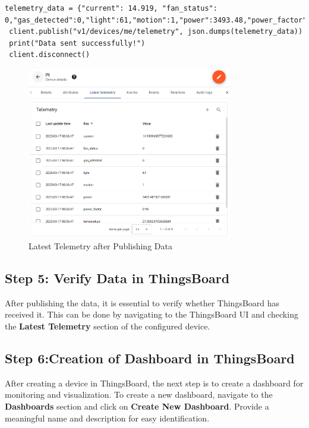 \documentclass[a4paper,12pt]{report}
\begin{document}
 \begin{lstlisting}[caption={Sending Telemetry Response in JSON}]
 telemetry_data = {"current": 14.919, "fan_status": 0,"gas_detected":0,"light":61,"motion":1,"power":3493.48,"power_factor":0.98,"temperature":27.85}
 client.publish("v1/devices/me/telemetry", json.dumps(telemetry_data))
 print("Data sent successfully!")
 client.disconnect()
 \end{lstlisting}

 \begin{figure}[H]
    \centering
    \includegraphics[width=0.8\textwidth]{device Details.PNG}
    \caption{Latest Telemetry after Publishing Data}
 \end{figure}
 
 \subsection{Step 5: Verify Data in ThingsBoard}
 After publishing the data, it is essential to verify whether ThingsBoard has received it. This can be done by navigating to the ThingsBoard UI and checking the \textbf{Latest Telemetry} section of the configured device.

 \subsection{Step 6:Creation of Dashboard in ThingsBoard}
 After creating a device in ThingsBoard, the next step is to create a dashboard for monitoring and visualization. To create a new dashboard, navigate to the \textbf{Dashboards} section and click on \textbf{Create New Dashboard}. Provide a meaningful name and description for easy identification.
\end{document}
